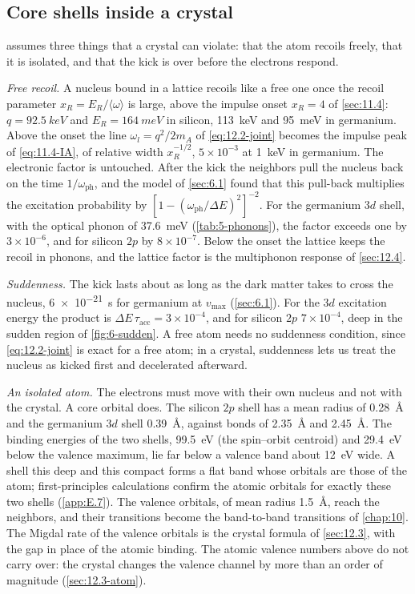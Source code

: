 \subsection{Core shells inside a crystal}\label{sec:12.2-cores}

 assumes three things that a crystal can violate: that the atom recoils freely, that it is isolated, and that the kick is over before the electrons respond.

\emph{Free recoil.} A nucleus bound in a lattice recoils like a free one once the recoil parameter $x_R = E_R/\langle\omega\rangle$ is large, above the impulse onset $x_R = 4$ of \cref{sec:11.4}: $q = \SI{92.5}{keV}$ and $E_R = \SI{164}{meV}$ in silicon, \SI{113}{keV} and \SI{95}{meV} in germanium. Above the onset the line $\omega_l = q^2/2m_A$ of \cref{eq:12.2-joint} becomes the impulse peak of \cref{eq:11.4-IA}, of relative width $x_R^{-1/2}$, $5\times10^{-3}$ at \SI{1}{keV} in germanium. The electronic factor is untouched. After the kick the neighbors pull the nucleus back on the time $1/\omega_{\mathrm{ph}}$, and the model of \cref{sec:6.1} found that this pull-back multiplies the excitation probability by $[1 - (\omega_{\mathrm{ph}}/\Delta E)^2]^{-2}$. For the germanium $3d$ shell, with the optical phonon of \SI{37.6}{meV} (\cref{tab:5-phonons}), the factor exceeds one by $3\times10^{-6}$, and for silicon $2p$ by $8\times10^{-7}$. Below the onset the lattice keeps the recoil in phonons, and the lattice factor is the multiphonon response of \cref{sec:12.4}.

\emph{Suddenness.} The kick lasts about as long as the dark matter takes to cross the nucleus, \SI{6e-21}{s} for germanium at $v_{\mathrm{max}}$ (\cref{sec:6.1}). For the $3d$ excitation energy the product is $\Delta E\,\tau_{\mathrm{acc}} = 3\times10^{-4}$, and for silicon $2p$ $7\times10^{-4}$, deep in the sudden region of \cref{fig:6-sudden}. A free atom needs no suddenness condition, since \cref{eq:12.2-joint} is exact for a free atom; in a crystal, suddenness lets us treat the nucleus as kicked first and decelerated afterward.

\emph{An isolated atom.} The electrons must move with their own nucleus and not with the crystal. A core orbital does. The silicon $2p$ shell has a mean radius of \SI{0.28}{\angstrom} and the germanium $3d$ shell \SI{0.39}{\angstrom}, against bonds of \SI{2.35}{\angstrom} and \SI{2.45}{\angstrom}. The binding energies of the two shells, \SI{99.5}{eV} (the spin--orbit centroid) and \SI{29.4}{eV} below the valence maximum, lie far below a valence band about \SI{12}{eV} wide. A shell this deep and this compact forms a flat band whose orbitals are those of the atom; first-principles calculations confirm the atomic orbitals for exactly these two shells (\cref{app:E.7}). The valence orbitals, of mean radius \SI{1.5}{\angstrom}, reach the neighbors, and their transitions become the band-to-band transitions of \cref{chap:10}. The Migdal rate of the valence orbitals is the crystal formula of \cref{sec:12.3}, with the gap in place of the atomic binding. The atomic valence numbers above do not carry over: the crystal changes the valence channel by more than an order of magnitude (\cref{sec:12.3-atom}).

